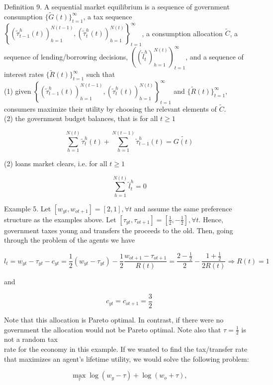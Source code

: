 \documentclass[10pt]{article}
\begin{document}
Definition 9. A sequential market equilibrium is a sequence of government consumption $\{\widetilde{G}(t)\}_{t=1}^{\infty}$, a tax sequence $\left\{\left(\widetilde{\tau}_{t-1}^{h}(t)\right)_{h=1}^{N(t-1)},\left(\widetilde{\tau}_{t}^{h}(t)\right)_{h=1}^{N(t)}\right\}_{t=1}^{\infty}$, a consumption allocation $\widetilde{C}$, a sequence of lending/borrowing decisions, $\left(\left(\widetilde{l}_{t}^{h}\right)_{h=1}^{N(t)}\right)_{t=1}^{\infty}$, and a sequence of interest rates $\{\widetilde{R}(t)\}_{t=1}^{\infty}$ such that\\
(1) given $\left\{\left(\widetilde{\tau}_{t-1}^{h}(t)\right)_{h=1}^{N(t-1)},\left(\widetilde{\tau}_{t}^{h}(t)\right)_{h=1}^{N(t)}\right\}_{t=1}^{\infty}$ and $\{\widetilde{R}(t)\}_{t=1}^{\infty}$, consumers maximize their utility by choosing the relevant elements of $\widetilde{C}$.\\
(2) the government budget balances, that is for all $t \geq 1$

$$
\sum_{h=1}^{N(t)} \widetilde{\tau}_{t}^{h}(t)+\sum_{h=1}^{N(t-1)} \widetilde{\tau}_{t-1}^{h}(t)=\widetilde{G(t)}
$$

(2) loans market clears, i.e. for all $t \geq 1$

$$
\sum_{h=1}^{N(t)} \widetilde{l}_{t}^{h}=0
$$

Example 5. Let $\left[w_{y t}, w_{o t+1}\right]=[2,1], \forall t$ and assume the same preference structure as the examples above. Let $\left[\tau_{y t}, \tau_{o t+1}\right]=\left[\frac{1}{2},-\frac{1}{2}\right], \forall t$. Hence, government taxes young and transfers the proceeds to the old. Then, going through the problem of the agents we have

$$
l_{t}=w_{y t}-\tau_{y t}-c_{y t}=\frac{1}{2}\left(w_{y t}-\tau_{y t}\right)-\frac{1}{2} \frac{w_{o t+1}-\tau_{o t+1}}{R(t)}=\frac{2-\frac{1}{2}}{2}-\frac{1+\frac{1}{2}}{2 R(t)} \Rightarrow R(t)=1
$$

and

$$
c_{y t}=c_{o t+1}=\frac{3}{2}
$$

Note that this allocation is Pareto optimal. In contrast, if there were no government the allocation would not be Pareto optimal. Note also that $\tau=\frac{1}{2}$ is not a random tax\\
rate for the economy in this example. If we wanted to find the tax/transfer rate that maximizes an agent's lifetime utility, we would solve the following problem:

$$
\max _{\tau} \log \left(w_{y}-\tau\right)+\log \left(w_{o}+\tau\right),
$$
\end{document}
